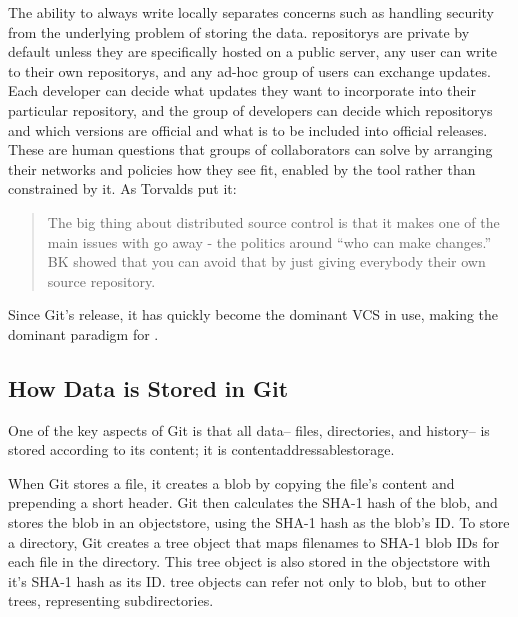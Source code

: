 The ability to always write locally separates concerns such as handling security
from the underlying problem of storing the data. \glspl{repository} are private
by default unless they are specifically hosted on a public server, any user can
write to their own \glspl{repository}, and any ad-hoc group of users can
exchange updates. Each developer can decide what updates they want to
incorporate into their particular \gls{repository}, and the group of developers
can decide which \glspl{repository} and which versions are official and what is
to be included into official releases. These are human questions that groups of
collaborators can solve by arranging their networks and policies how they see
fit, enabled by the tool rather than constrained by it. As Torvalds put it:

\blockcquote{git_10_years_interview}{The big thing about distributed source
    control is that it makes one of the main issues with  go
    away - the politics around \enquote{who can make changes.} BK
     showed that you can avoid that by just giving everybody
their own source \gls{repository}. }

Since Git's release, it has quickly become the dominant \gls{VCS} in
use\cite{what_are_devs_talking_about}, making  the dominant paradigm for .

%


\subsection{How Data is Stored in Git}
\label{how-data-stored-in-git}

One of the key aspects of Git is that all data-- files, directories, and
history-- is stored according to its content; it is
\gls{contentaddressablestorage}.

When Git stores a file, it creates a \gls{blob} by copying the file's content
and prepending a short header. Git then calculates the SHA-1 hash of the
\gls{blob}, and stores the \gls{blob} in an \gls{objectstore}, using the SHA-1
hash as the \gls{blob}'s ID. To store a directory, Git creates a \gls{tree}
object that maps filenames to SHA-1 \gls{blob} IDs for each file in the
directory. This \gls{tree} object is also stored in the \gls{objectstore} with
it's SHA-1 hash as its ID. \Gls{tree} objects can refer not only to \gls{blob},
but to other \glspl{tree}, representing subdirectories.

